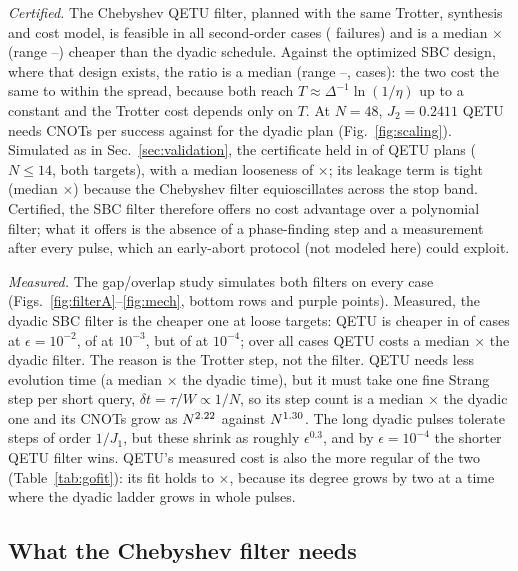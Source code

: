 \documentclass[aps,pra,twocolumn,superscriptaddress,nofootinbib]{revtex4-2}
\begin{document}
\emph{Certified.} The Chebyshev QETU filter, planned with the same Trotter, synthesis and
cost model, is feasible in all \qetuN{} second-order cases (\qetuFail{} failures) and is a median
\qetuDyaMed$\times$ (range \qetuDyaMin--\qetuDyaMax) cheaper than the dyadic schedule. Against the
optimized SBC design, where that design exists, the ratio is a median \qetuOptMed{} (range
\qetuOptMin--\qetuOptMax, \qetuOptN{} cases): the two cost the same to within the spread, because both
reach $T\approx\Delta^{-1}\ln(1/\eta)$ up to a constant and the Trotter cost depends only on $T$. At
$N=48$, $J_2=0.2411$ QETU needs \qetuFortyEight{} CNOTs per success against \cnotFortyEight{} for the
dyadic plan (Fig.~\ref{fig:scaling}). Simulated as in Sec.~\ref{sec:validation}, the certificate held in
\qetuNSimOK{} of \qetuNSim{} QETU plans ($N\le14$, both targets), with a median looseness of
\qetuBoundMed$\times$; its leakage term is tight (median \qetuLeakMed$\times$) because the Chebyshev
filter equioscillates across the stop band. Certified, the SBC filter therefore offers no cost advantage over a
polynomial filter; what it offers is the absence of a phase-finding step and a measurement after every
pulse, which an early-abort protocol (not modeled here) could exploit.

\emph{Measured.} The gap/overlap study simulates both filters on every case
(Figs.~\ref{fig:filterA}--\ref{fig:mech}, bottom rows and purple points). Measured, the dyadic SBC filter is
the cheaper one at loose targets: QETU is cheaper in \goQetuWinsTwo{} of \goCasesTwo{} cases at
$\epsilon=10^{-2}$, \goQetuWinsThree{} of \goCasesThree{} at $10^{-3}$, but \goQetuWinsFour{} of
\goCasesFour{} at $10^{-4}$; over all cases QETU costs a median \goQetuOverDyMed$\times$ the dyadic filter.
The reason is the Trotter step, not the filter. QETU needs less evolution time (a median \fQDtime$\times$
the dyadic time), but it must take one fine Strang step per short query, $\delta t=\tau/W\propto1/N$, so its
step count is a median \fQDsteps$\times$ the dyadic one and its CNOTs grow as $N^{2.22}$ against
$N^{1.30}$. The long dyadic pulses tolerate steps of order $1/J_1$, but these shrink as roughly
$\epsilon^{0.3}$, and by $\epsilon=10^{-4}$ the shorter QETU filter wins. QETU's measured cost is also the more
regular of the two (Table~\ref{tab:gofit}): its fit holds to \goMQrms$\times$, because its degree grows by
two at a time where the dyadic ladder grows in whole pulses.

\subsection{What the Chebyshev filter needs}
\label{sec:empirical}
\end{document}
